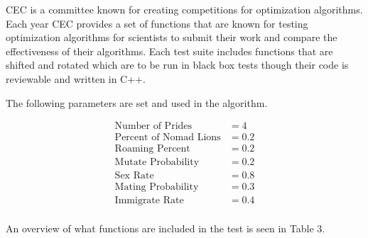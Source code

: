 CEC is a committee known for creating competitions for optimization algorithms. Each year CEC provides a set of functions that are known for testing optimization algorithms for scientists to submit their work and compare the effectiveness of their algorithms. Each test suite includes functions that are shifted and rotated which are to be run in black box tests though their code is reviewable and written in C++.

The following parameters are set and used in the algorithm.

\begin{align*}
\text{Number of Prides} &= 4\\
\text{Percent of Nomad Lions} &= 0.2\\
\text{Roaming Percent} &= 0.2\\
\text{Mutate Probability} &= 0.2\\
\text{Sex Rate} &= 0.8\\
\text{Mating Probability} &= 0.3\\
\text{Immigrate Rate} &= 0.4\\
\end{align*}

\clearpage

An overview of what functions are included in the test is seen in Table 3.

